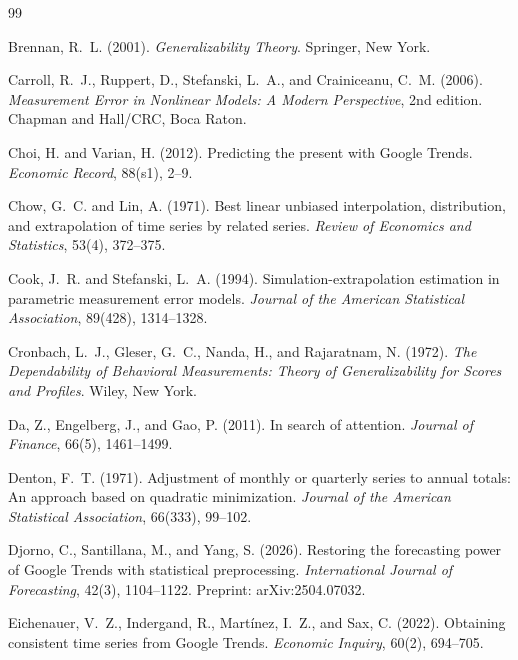 \documentclass[12pt,a4paper,oneside]{article}
\begin{document}
\begin{thebibliography}{99}
\small

Brennan, R.~L. (2001). \textit{Generalizability Theory}. Springer, New York.

Carroll, R.~J., Ruppert, D., Stefanski, L.~A., and Crainiceanu, C.~M. (2006).
\textit{Measurement Error in Nonlinear Models: A Modern Perspective},
2nd edition. Chapman and Hall/CRC, Boca Raton.

Choi, H. and Varian, H. (2012). Predicting the present with Google Trends.
\textit{Economic Record}, 88(s1), 2--9.

Chow, G.~C. and Lin, A. (1971). Best linear unbiased interpolation,
distribution, and extrapolation of time series by related series.
\textit{Review of Economics and Statistics}, 53(4), 372--375.

Cook, J.~R. and Stefanski, L.~A. (1994). Simulation-extrapolation estimation in
parametric measurement error models. \textit{Journal of the American
Statistical Association}, 89(428), 1314--1328.

Cronbach, L.~J., Gleser, G.~C., Nanda, H., and Rajaratnam, N. (1972).
\textit{The Dependability of Behavioral Measurements: Theory of
Generalizability for Scores and Profiles}. Wiley, New York.

Da, Z., Engelberg, J., and Gao, P. (2011). In search of attention.
\textit{Journal of Finance}, 66(5), 1461--1499.

Denton, F.~T. (1971). Adjustment of monthly or quarterly series to annual
totals: An approach based on quadratic minimization. \textit{Journal of the
American Statistical Association}, 66(333), 99--102.

Djorno, C., Santillana, M., and Yang, S. (2026). Restoring the forecasting power
of Google Trends with statistical preprocessing. \textit{International Journal
of Forecasting}, 42(3), 1104--1122. Preprint: arXiv:2504.07032.

Eichenauer, V.~Z., Indergand, R., Mart\'{i}nez, I.~Z., and Sax, C. (2022).
Obtaining consistent time series from Google Trends.
\textit{Economic Inquiry}, 60(2), 694--705.


\end{thebibliography}
\end{document}
